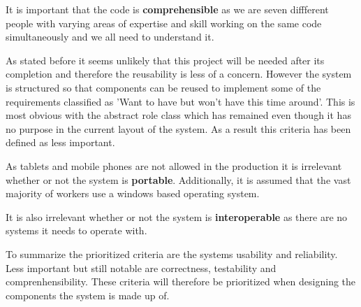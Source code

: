 It is important that the code is \textbf{comprehensible} as we are seven diffferent people with varying areas of expertise and skill working on the same code simultaneously and we all need to understand it.

As stated before it seems unlikely that this project will be needed after its completion and therefore the reusability is less of a concern. However the system is structured so that components can be reused to implement some of the requirements classified as 'Want to have but won't have this time around'. This is most obvious with the abstract role class which has remained even though it has no purpose in the current layout of the system. As a result this criteria has been defined as less important.

As tablets and mobile phones are not allowed in the production it is irrelevant whether or not the system is \textbf{portable}. Additionally, it is assumed that the vast majority of workers use a windows based operating system.

It is also irrelevant whether or not the system is \textbf{interoperable} as there are no systems it needs to operate with.

To summarize the prioritized criteria are the systems usability and reliability. Less important but still notable are correctness, testability and comprenhensibility. These criteria will therefore be prioritized when designing the components the system is made up of.
